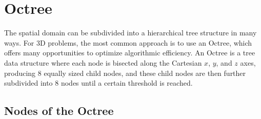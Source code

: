 \section{Octree} \label{sec:octree}
The spatial domain can be subdivided into a hierarchical tree structure in many ways. For 3D problems, the most common approach is to use an Octree, which offers many opportunities to optimize algorithmic efficiency. An Octree is a tree data structure where each node is bisected along the Cartesian $x$, $y$, and $z$ axes, producing 8 equally sized child nodes, and these child nodes are then further subdivided into 8 nodes until a certain threshold is reached.

\subsection{Nodes of the Octree} \label{subsec:node}

